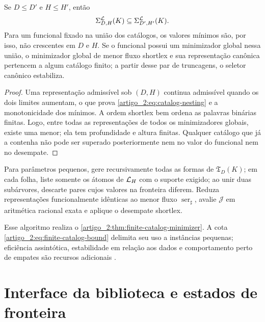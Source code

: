 \begin{proposition}\label{map:artigo_2:3.24}
\label{artigo_2:prop:catalog-consistency}
Se $D\le D'$ e $H\le H'$, então
\begin{equation}
 \Sigma_{D,H}^{\mathcal{L}}(K)
 \subseteq\Sigma_{D',H'}^{\mathcal{L}}(K).
 \label{artigo_2:eq:catalog-nesting}
\end{equation}
Para um funcional fixado na união dos catálogos, os valores mínimos são, por
isso, não crescentes em $D$ e $H$. Se o funcional possui um minimizador global
nessa união, o minimizador global de menor fluxo shortlex e sua representação
canônica pertencem a algum catálogo finito; a partir desse par de truncagens,
o seletor canônico estabiliza.
\end{proposition}

\begin{proof}
Uma representação admissível sob $(D,H)$ continua admissível quando os dois
limites aumentam, o que prova \eqref{artigo_2:eq:catalog-nesting} e a monotonicidade dos
mínimos. A ordem shortlex bem ordena as palavras binárias finitas. Logo, entre
todas as representações de todos os minimizadores globais, existe uma menor;
ela tem profundidade e altura finitas. Qualquer catálogo que já a contenha não
pode ser superado posteriormente nem no valor do funcional nem no desempate.
\end{proof}

\begin{algorithm}\label{map:artigo_2:3.25}\label{artigo_2:alg:finite-enumeration}
Para parâmetros pequenos, gere recursivamente todas as formas de
$\mathfrak T_D(K)$; em cada folha, liste somente os átomos de $\mathcal{L}_H$ com
o suporte exigido; ao unir duas subárvores, descarte pares cujos valores na
fronteira diferem. Reduza representações funcionalmente idênticas ao menor
fluxo $\operatorname{ser}_\sharp$, avalie $\mathcal J$ em aritmética racional
exata e aplique o desempate shortlex.
\end{algorithm}

Esse algoritmo realiza o
\cref{artigo_2:thm:finite-catalog-minimizer}. A cota
\eqref{artigo_2:eq:finite-catalog-bound} delimita seu uso a instâncias pequenas;
eficiência assintótica, estabilidade em relação aos dados e comportamento
perto de empates são recursos adicionais \citep{artigo_1-christof2021}.

\section{Interface da biblioteca e estados de fronteira}
\label{artigo_2:sec:interface}

